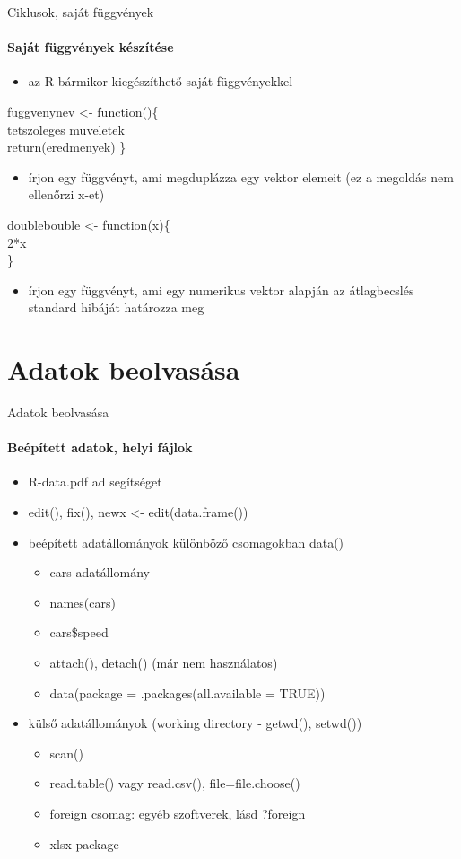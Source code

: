 \documentclass[10pt]{beamer}
\begin{document}
\begin{frame}{Ciklusok, saját függvények}
\framesubtitle{Saját függvények készítése}
\begin{itemize}
\item az R bármikor kiegészíthető saját függvényekkel
\end{itemize}
fuggvenynev <- function()\{\\
tetszoleges muveletek\\
return(eredmenyek)
\}
\begin{itemize}
\item írjon egy függvényt, ami megduplázza egy vektor elemeit (ez a megoldás nem ellenőrzi x-et)
\end{itemize}
doublebouble <- function(x)\{\\
2*x\\
\}
\begin{itemize}
\item írjon egy függvényt, ami egy numerikus vektor alapján az átlagbecslés standard hibáját határozza meg
\end{itemize}
\end{frame}

\section{Adatok beolvasása}

\begin{frame}{Adatok beolvasása}
\framesubtitle{Beépített adatok, helyi fájlok}
\begin{itemize}
\item R-data.pdf ad segítséget
\item edit(), fix(), newx <- edit(data.frame())
\item beépített adatállományok különböző csomagokban data()
\begin{itemize}
\item cars adatállomány
\item names(cars)
\item cars\$speed
\item attach(), detach() (már nem használatos)
\item data(package = .packages(all.available = TRUE))
\end{itemize}
\item külső adatállományok (working directory - getwd(), setwd())
\begin{itemize}
\item scan()
\item read.table() vagy read.csv(), file=file.choose()
\item foreign csomag: egyéb szoftverek, lásd ?foreign
\item xlsx package
\end{itemize}
\end{itemize}
\end{frame}
\end{document}
